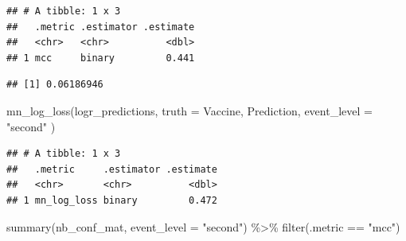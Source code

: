 \documentclass[
]{article}
\newenvironment{Shaded}{\begin{snugshade}}{\end{snugshade}}
\newcommand{\AttributeTok}[1]{\textcolor[rgb]{0.77,0.63,0.00}{#1}}
\newcommand{\DecValTok}[1]{\textcolor[rgb]{0.00,0.00,0.81}{#1}}
\newcommand{\FunctionTok}[1]{\textcolor[rgb]{0.00,0.00,0.00}{#1}}
\newcommand{\NormalTok}[1]{#1}
\newcommand{\OtherTok}[1]{\textcolor[rgb]{0.56,0.35,0.01}{#1}}
\newcommand{\SpecialCharTok}[1]{\textcolor[rgb]{0.00,0.00,0.00}{#1}}
\newcommand{\StringTok}[1]{\textcolor[rgb]{0.31,0.60,0.02}{#1}}
\begin{document}
\begin{verbatim}
## # A tibble: 1 x 3
##   .metric .estimator .estimate
##   <chr>   <chr>          <dbl>
## 1 mcc     binary         0.441
\end{verbatim}

\begin{Shaded}
\end{Shaded}

\begin{verbatim}
## [1] 0.06186946
\end{verbatim}

\begin{Shaded}
\begin{Highlighting}[]
\FunctionTok{mn\_log\_loss}\NormalTok{(logr\_predictions,}
            \AttributeTok{truth =}\NormalTok{ Vaccine,}
\NormalTok{            Prediction,}
            \AttributeTok{event\_level =} \StringTok{"second"}
\NormalTok{)}
\end{Highlighting}
\end{Shaded}

\begin{verbatim}
## # A tibble: 1 x 3
##   .metric     .estimator .estimate
##   <chr>       <chr>          <dbl>
## 1 mn_log_loss binary         0.472
\end{verbatim}

\begin{Shaded}
\begin{Highlighting}[]
\FunctionTok{summary}\NormalTok{(nb\_conf\_mat, }\AttributeTok{event\_level =} \StringTok{"second"}\NormalTok{) }\SpecialCharTok{\%\textgreater{}\%} \FunctionTok{filter}\NormalTok{(.metric }\SpecialCharTok{==} \StringTok{"mcc"}\NormalTok{)}
\end{Highlighting}
\end{Shaded}
\end{document}
